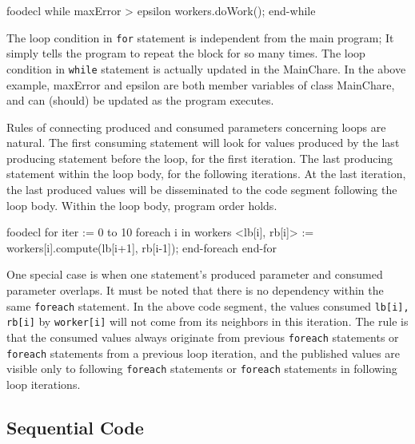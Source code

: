 \documentclass[10pt]{article}
\def\smallfbox#1{\small \fbox{#1}}
\def\code#1{{\small {\tt {#1}}}}
\begin{document}
\begin{SaveVerbatim}{foodecl}
  while maxError > epsilon
     workers.doWork();
  end-while
\end{SaveVerbatim}
\vspace{0.1in}
\smallfbox{\BUseVerbatim{foodecl}}
\vspace{0.1in}

The loop condition in \code{for} statement is independent from the main program;
It simply tells the program to repeat the block for so many times. The loop
condition in \code{while} statement is actually updated in the MainChare. In the
above example, maxError and epsilon are both member variables of class
MainChare, and can (should) be updated as the program executes. 

Rules of connecting produced and consumed parameters concerning loops are
natural. The first consuming statement will look for values produced by the last
producing statement before the loop, for the first iteration. The last
producing statement within the loop body, for the following iterations. At the
last iteration, the last produced values will be disseminated to the code
segment following the loop body. Within the loop body, program order holds. 

\begin{SaveVerbatim}{foodecl}
  for iter := 0 to 10
    foreach i in workers
      <lb[i], rb[i]> := workers[i].compute(lb[i+1], rb[i-1]);
    end-foreach
  end-for
\end{SaveVerbatim}
\vspace{0.1in}
\smallfbox{\BUseVerbatim{foodecl}}
\vspace{0.1in}

One special case is when one statement's produced parameter and consumed
parameter overlaps. It must be noted that there is no dependency within the same
\code{foreach} statement. In the above code segment, the values consumed
\code{lb[i], rb[i]} by \code{worker[i]} will not come from  
its neighbors in this iteration. The rule is that the consumed values always
originate from previous \code{foreach} statements or \code{foreach} statements
from a previous loop iteration, and the published values are visible only to
following \code{foreach} statements or \code{foreach} statements in following
loop iterations. 


\subsection{Sequential Code}
\label{sec:sequential}
\end{document}

